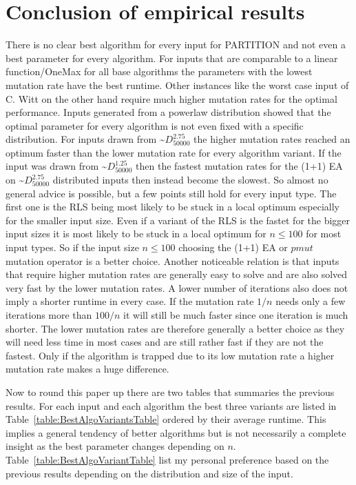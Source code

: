 \section{Conclusion of empirical results}
There is no clear best algorithm for every input for PARTITION and not even a best parameter for every algorithm.
For inputs that are comparable to a linear function/OneMax for all base algorithms the parameters with the lowest mutation rate have the best runtime.
Other instances like the worst case input of C. Witt on the other hand require much higher mutation rates for the optimal performance.
Inputs generated from a powerlaw distribution showed that the optimal parameter for every algorithm is not even fixed with a specific distribution.
For inputs drawn from \textasciitilde$D^{2.75}_{50000}$ the higher mutation rates reached an optimum faster than the lower mutation rate for every algorithm variant.
If the input was drawn from \textasciitilde$D^{1.25}_{50000}$ then the fastest mutation rates for the (1+1) EA on \textasciitilde$D^{2.75}_{50000}$ distributed inputs then instead become the slowest.
So almost no general advice is possible, but a few points still hold for every input type.
The first one is the RLS being most likely to be stuck in a local optimum especially for the smaller input size.
Even if a variant of the RLS is the fastet for the bigger input sizes it is most likely to be stuck in a local optimum for $n\le100$ for most input types.
So if the input size $n\le100$ choosing the (1+1) EA or $pmut$ mutation operator is a better choice.
Another noticeable relation is that inputs that require higher mutation rates are generally easy to solve and are also solved very fast by the lower mutation rates.
A lower number of iterations also does not imply a shorter runtime in every case.
If the mutation rate $1/n$ needs only a few iterations more than $100/n$ it will still be much faster since one iteration is much shorter.
The lower mutation rates are therefore generally a better choice as they will need less time in most cases and are still rather fast if they are not the fastest.
Only if the algorithm is trapped due to its low mutation rate a higher mutation rate makes a huge difference.

Now to round this paper up there are two tables that summaries the previous results.
For each input and each algorithm the best three variants are listed in Table~\ref{table:BestAlgoVariantsTable} ordered by their average runtime.
This implies a general tendency of better algorithms but is not necessarily a complete insight as the best parameter changes depending on $n$.
Table~\ref{table:BestAlgoVariantTable} list my personal preference based on the previous results depending on the distribution and size of the input.

